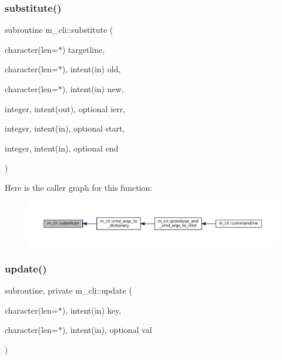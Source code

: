 \subsubsection{\texorpdfstring{substitute()}{substitute()}}
{\footnotesize\ttfamily subroutine m\+\_\+cli\+::substitute (\begin{DoxyParamCaption}\item[{character(len=$\ast$)}]{targetline,  }\item[{character(len=$\ast$), intent(in)}]{old,  }\item[{character(len=$\ast$), intent(in)}]{new,  }\item[{integer, intent(out), optional}]{ierr,  }\item[{integer, intent(in), optional}]{start,  }\item[{integer, intent(in), optional}]{end }\end{DoxyParamCaption})\hspace{0.3cm}{\ttfamily [private]}}

Here is the caller graph for this function\+:\nopagebreak
\begin{figure}[H]
\begin{center}
\leavevmode
\includegraphics[width=350pt]{namespacem__cli_a3b66fe9cee0e084068051636afb2957d_icgraph}
\end{center}
\end{figure}
\mbox{\label{namespacem__cli_a9b7676d796e5cb878ecd9294b8a689cb}} 
\subsubsection{\texorpdfstring{update()}{update()}}
{\footnotesize\ttfamily subroutine, private m\+\_\+cli\+::update (\begin{DoxyParamCaption}\item[{character(len=$\ast$), intent(in)}]{key,  }\item[{character(len=$\ast$), intent(in), optional}]{val }\end{DoxyParamCaption})\hspace{0.3cm}{\ttfamily [private]}}



